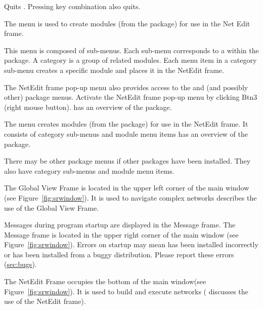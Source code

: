\begin{description}
\begin{description}
\begin{description}
       Quits \sr{}.  Pressing key combination
       also quits.
    \end{description}
  \end{description}
  
  \begin{description}
     The  menu is used to create modules
    (from the \sr{} package) for use in the Net Edit frame.

    This menu is composed of sub-menus. Each sub-menu corresponds to
     a 
     within the \sr{} package.  A category is a group of
    related modules.  Each menu item in a category sub-menu creates a
    specific module and places it in the NetEdit frame.  
    
    The NetEdit frame pop-up menu  also
    provides access to the \menu{\sr{}} and \menu{\biopse{}} (and
    possibly other) package menus. Activate the NetEdit frame pop-up
    menu by clicking Btn3 (right mouse button).  has an overview of the
    \sr{} package.
  \end{description}

  \begin{description}
     The  menu creates modules (from the
    \biopse package) for use in the NetEdit frame.  It consists of
    category sub-menus and module menu items  has an overview of the \biopse{}package.
  \end{description}

  \begin{description}
     There may be other
    package menus if other packages have been installed.  They also
    have category sub-menus and module menu items.
  \end{description}
  
   The Global View Frame is located in the
  upper left corner of the main window (see
  Figure~\ref{fig:srwindow}). It is used to navigate complex networks
   describes the use of the Global View Frame.
  
   Messages during program startup are displayed
  in the Message frame.  The Message frame is located in the upper right
  corner of the main window (see Figure~\ref{fig:srwindow}).  Errors on
  startup may mean \sr{} has been installed incorrectly or has
  been installed from a buggy distribution.  Please report these
  errors (\hyperref{report}{see Section~}{)}{sec:bugs}).
  
   The NetEdit Frame occupies the bottom of
  the main window(see Figure~\ref{fig:srwindow}).  It is used to build
  and execute networks (
  discusses the use of the NetEdit frame).

\end{description}

